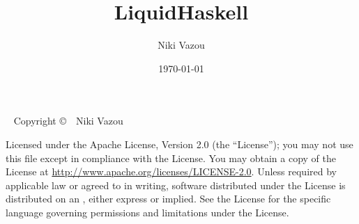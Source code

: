 \documentclass{tufte-book}
\title{LiquidHaskell}
\author{Niki Vazou}
\date{\today}
\begin{document}
\maketitle


\newpage

\begin{fullwidth}
~\vfill
\thispagestyle{empty}
\setlength{\parindent}{0pt}
\setlength{\parskip}{\baselineskip}
Copyright \copyright\ \the\year\ Niki Vazou

\par{}

\par Licensed under the Apache License, Version 2.0 (the ``License''); you may not
use this file except in compliance with the License. You may obtain a copy
of the License at \url{http://www.apache.org/licenses/LICENSE-2.0}. Unless
required by applicable law or agreed to in writing, software distributed
under the License is distributed on an , either express or implied. See the
License for the specific language governing permissions and limitations
under the License.


\end{fullwidth}

{
\setcounter{tocdepth}{5}
\tableofcontents
}

\listoftables

\listoffigures











\end{document}
